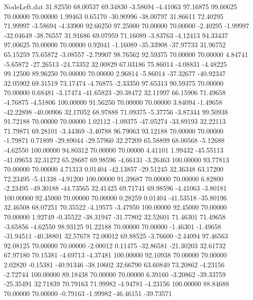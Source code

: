 \begin{filecontents}{NodeLeft.dat}
  31.82550   68.00537   69.34830    -3.58694   -4.41063   97.16875   99.60625   70.00000   70.00000    1.99463    0.65170  -30.90996  -38.00797
  31.86611   72.40295   71.99997    -3.58694   -4.33900   92.66250   97.25000   70.00000   70.00000   -2.40295   -1.99997  -32.04649  -38.76557
  31.91686   69.07959   71.16089    -3.83763   -4.12413   94.33437   97.00625   70.00000   70.00000    0.92041   -1.16089  -35.33908  -37.97733
  31.96752   65.15259   75.65872    -3.08557   -2.79907   98.76562   92.59375   70.00000   70.00000    4.84741   -5.65872  -27.26513  -24.73352
  32.00829   67.03186   75.86014    -4.08831   -4.48225   99.12500   89.96250   70.00000   70.00000    2.96814   -5.86014  -37.32677  -40.92347
  32.05902   69.31519   73.17474    -4.76875   -2.33350   97.65313   90.59375   70.00000   70.00000    0.68481   -3.17474  -41.65823  -20.38472
  32.11997   66.15906   71.49658    -4.76875   -4.51806  100.00000   91.56250   70.00000   70.00000    3.84094   -1.49658  -42.22898  -40.00906
  32.17052   68.97888   71.09375    -5.37756   -3.87344   99.50938   91.72188   70.00000   70.00000    1.02112   -1.09375  -47.05274  -33.89193
  32.22113   71.79871   69.28101    -3.44369   -3.40788   96.79063   93.12188   70.00000   70.00000   -1.79871    0.71899  -29.89044  -29.57960
  32.27209   65.58899   68.00568    -5.12688   -4.62550  100.00000   94.80312   70.00000   70.00000    4.41101    1.99432  -45.55113  -41.09653
  32.31272   65.28687   69.98596    -4.66131   -3.26463  100.00000   93.77813   70.00000   70.00000    4.71313    0.01404  -42.13857  -29.51245
  32.36348   63.17200   72.23495    -5.41338   -4.91200  100.00000   91.39687   70.00000   70.00000    6.82800   -2.23495  -49.30188  -44.73565
  32.41425   69.71741   69.98596    -4.41063   -3.80181  100.00000   92.45000   70.00000   70.00000    0.28259    0.01404  -41.53518  -35.80196
  32.46508   68.07251   70.35522    -4.19575   -3.47950  100.00000   92.45000   70.00000   70.00000    1.92749   -0.35522  -38.31947  -31.77802
  32.52601   71.46301   71.49658    -3.65856   -4.62550   98.93125   91.22188   70.00000   70.00000   -1.46301   -1.49658  -31.94511  -40.38801
  32.57678   72.00012   69.88525    -3.76600   -2.44094   97.46563   92.08125   70.00000   70.00000   -2.00012    0.11475  -32.86581  -21.30203
  32.61732   67.97180   70.15381    -4.69713   -4.37481  100.00000   92.10938   70.00000   70.00000    2.02820   -0.15381  -40.91346  -38.10602
  32.66790   63.60840   73.20862    -4.23156   -2.72744  100.00000   89.18438   70.00000   70.00000    6.39160   -3.20862  -39.33759  -25.35491
  32.71839   70.79163   71.99982    -4.94781   -4.23156  100.00000   88.84688   70.00000   70.00000   -0.79163   -1.99982  -46.46151  -39.73571

\end{filecontents}
